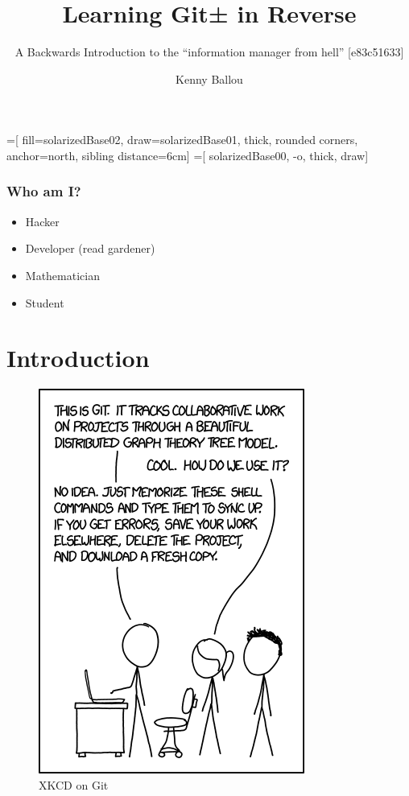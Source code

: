 \documentclass{beamer}
\title{Learning Git± in Reverse}
\subtitle{A Backwards Introduction to the ``information manager from hell''
[e83c51633]}
\author[Ballou]{Kenny Ballou}
\institute[zData]{%
    \inst{}%
    zData, Inc.
}
\begin{document}
=[%
    fill=solarizedBase02,
    draw=solarizedBase01,
    thick,
    rounded corners,
    anchor=north,
    sibling distance=6cm]
=[%
    solarizedBase00,
    -o,
    thick,
    draw]


\begin{frame}[label=titleslide]
\titlepage{}
\end{frame}

\begin{frame}
\tableofcontents[subsectionstyle=hide]
\end{frame}

\begin{frame}
\frametitle{Who am I?}
\begin{itemize}
\item{Hacker}
\item{Developer (read gardener)}
\item{Mathematician}
\item{Student}
\end{itemize}

\end{frame}

\section{Introduction}

\begin{frame}
\begin{figure}
\includegraphics[scale=0.45]{xkcd_git.png}
\caption{XKCD on Git\cite{website:xkcd_git_comic}}
\end{figure}
\end{frame}
\end{document}

